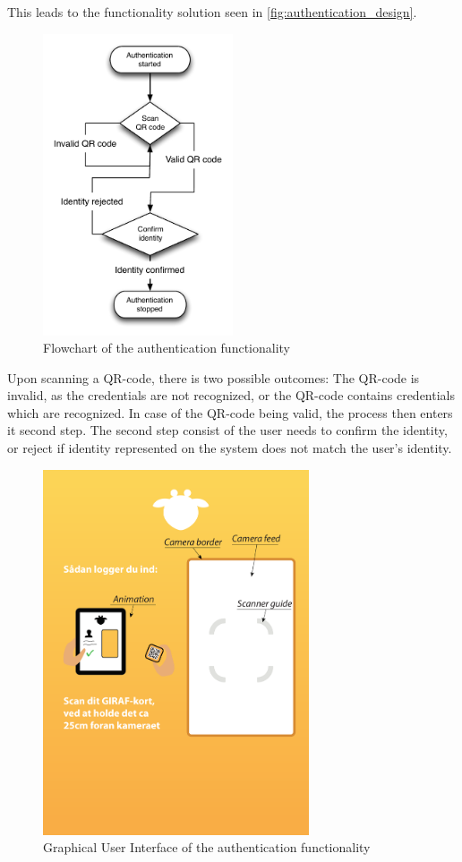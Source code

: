 This leads to the functionality solution seen in \autoref{fig:authentication_design}.
\begin{figure}[h]
	\centering
	\includegraphics[width=0.5\textwidth]{gfx/authentication_design.pdf}
	\caption{Flowchart of the authentication functionality}
	\label{fig:authentication_design}
\end{figure}

Upon scanning a QR-code, there is two possible outcomes: The QR-code is invalid, as the credentials are not recognized, or the QR-code contains credentials which are recognized.
In case of the QR-code being valid, the process then enters it second step. The second step consist of the user needs to confirm the identity, or reject if identity represented on the system does not match the user's identity.

\begin{figure}[h]
	\centering
	\includegraphics[width=0.7\textwidth]{gfx/authentication_gui_design_init.pdf}
	\caption{Graphical User Interface of the authentication functionality}
	\label{fig:authentication_gui_design_init}
\end{figure}